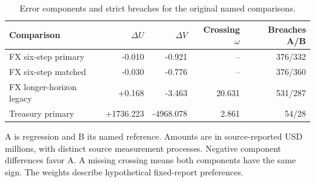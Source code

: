 \begin{table}[!htbp]
\centering\small
\caption{Error components and strict breaches for the original named comparisons.}\label{tab:uv}
\begin{tabular}{lrrrr}
\toprule
Comparison & $\Delta U$ & $\Delta V$ & Crossing $\omega$ & Breaches A/B \\
\midrule
FX six-step primary & -0.010 & -0.921 & -- & 376/332 \\
FX six-step matched & -0.030 & -0.776 & -- & 376/360 \\
FX longer-horizon legacy & +0.168 & -3.463 & 20.631 & 531/287 \\
Treasury primary & +1736.223 & -4968.078 & 2.861 & 54/28 \\
\bottomrule
\end{tabular}
\par\smallskip\begin{minipage}{\linewidth}\footnotesize A is regression and B its named reference. Amounts are in source-reported USD millions, with distinct source measurement processes. Negative component differences favor A. A missing crossing means both components have the same sign. The weights describe hypothetical fixed-report preferences.\end{minipage}
\end{table}

